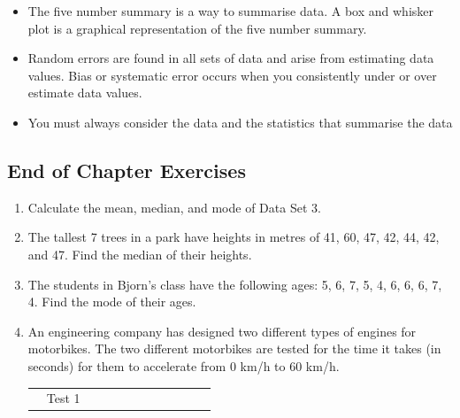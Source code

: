 \begin{description}[noitemsep]
\begin{description}[noitemsep]
\begin{itemize}[noitemsep, label=\textbullet{}]
        \item The five number summary is a way to summarise data. A box and whisker plot is a graphical representation of the five number summary.\item Random errors are found in all sets of data and arise from estimating data values. Bias or systematic error occurs when you consistently under or over estimate data values.\item You must always consider the data and the statistics that summarise the data\end{itemize}
    \label{m39404*cid10}
            \subsection{ End of Chapter Exercises}
            \nopagebreak
      \label{m39404*id216570}\begin{enumerate}[noitemsep, label=\textbf{\arabic*}. ] 
            \label{m39404*uid125}\item Calculate the mean, median, and mode of Data Set 3.\newline
\label{m39404*uid126}\item The tallest 7 trees in a park have heights in metres of 41, 60, 47, 42, 44, 42, and 47. Find the median of their heights.\newline
\label{m39404*uid127}\item The students in Bjorn's class have the following ages: 5, 6, 7, 5, 4, 6, 6, 6, 7, 4. Find the mode of their ages.\newline
\label{m39404*uid132}\item An engineering company has designed two different types of engines for motorbikes. The two different motorbikes are tested for the time it takes (in seconds) for them to accelerate from 0 km/h to 60 km/h.
          \begin{table}[H]
        \begin{center}
      \label{m39404*id217268}
    \noindent
      \tablelasttail{}
      \begin{xtabular}[t]{|l|l|l|l|l|l|l|l|l|l|l|l|}\hline
         &
        Test 1 &

\end{xtabular}
\end{center}
\end{table}
\end{enumerate}
\end{description}
\end{description}
